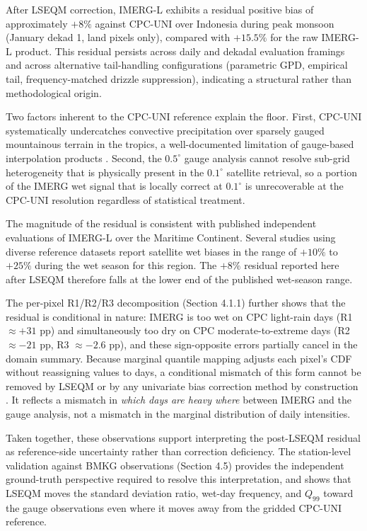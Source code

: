\documentclass[remotesensing,article,submit,pdftex,moreauthors]{Definitions/mdpi}
\begin{document}
After LSEQM correction, IMERG-L exhibits a residual positive bias of
approximately \(+8\%\) against CPC-UNI over Indonesia during peak
monsoon (January dekad 1, land pixels only), compared with \(+15.5\%\)
for the raw IMERG-L product. This residual persists across daily and
dekadal evaluation framings and across alternative tail-handling
configurations (parametric GPD, empirical tail, frequency-matched
drizzle suppression), indicating a structural rather than methodological
origin.

Two factors inherent to the CPC-UNI reference explain the floor. First,
CPC-UNI systematically undercatches convective precipitation over
sparsely gauged mountainous terrain in the tropics, a well-documented
limitation of gauge-based interpolation products \cite{ref36,ref37}. Second,
the \(0.5^{\circ}\) gauge analysis cannot resolve sub-grid heterogeneity
that is physically present in the \(0.1^{\circ}\) satellite retrieval,
so a portion of the IMERG wet signal that is locally correct at
\(0.1^{\circ}\) is unrecoverable at the CPC-UNI resolution regardless of
statistical treatment.

The magnitude of the residual is consistent with published independent
evaluations of IMERG-L over the Maritime Continent. Several studies
using diverse reference datasets \cite{ref31,ref32,ref33,ref38,ref39,ref47} report
satellite wet biases in the range of \(+10\%\) to \(+25\%\) during the
wet season for this region. The \(+8\%\) residual reported here after
LSEQM therefore falls at the lower end of the published wet-season
range.

The per-pixel R1/R2/R3 decomposition (Section 4.1.1) further shows that
the residual is conditional in nature: IMERG is too wet on CPC
light-rain days (R1 \(\approx +31\) pp) and simultaneously too dry on
CPC moderate-to-extreme days (R2 \(\approx -21\) pp, R3 \(\approx -2.6\)
pp), and these sign-opposite errors partially cancel in the domain
summary. Because marginal quantile mapping adjusts each pixel's CDF
without reassigning values to days, a conditional mismatch of this form
cannot be removed by LSEQM or by any univariate bias correction method
by construction \cite{ref34,ref11}. It reflects a mismatch in \emph{which days
are heavy where} between IMERG and the gauge analysis, not a mismatch in
the marginal distribution of daily intensities.

Taken together, these observations support interpreting the post-LSEQM
residual as reference-side uncertainty rather than correction
deficiency. The station-level validation against BMKG observations
(Section 4.5) provides the independent ground-truth perspective required
to resolve this interpretation, and shows that LSEQM moves the standard
deviation ratio, wet-day frequency, and \(Q_{99}\) toward the gauge
observations even where it moves away from the gridded CPC-UNI
reference.
\end{document}
